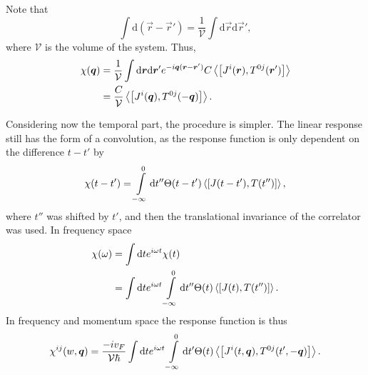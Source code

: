 Note that
\begin{equation}
  \int \mathrm{d}(\vec{r} - \vec{r}') = \frac{1}{\mathcal{V}} \int \mathrm{d}\vec{r} \mathrm{d} \vec{r}',
\end{equation}
where $\mathcal{V}$ is the volume of the system.
Thus,
\begin{equation}
  \begin{split}
    \chi (\vec{q}) &= \frac{1}{\mathcal{V}} \int \mathrm{d}\vec{r} \mathrm{d}\vec{r}'
    e^{-i\vec{q}(\vec{r}-\vec{r}')}
    C \Braket{\left[
        J^i(\vec{r}), T^{0j}(\vec{r}')
      \right]}\\
    &= \frac{C}{\mathcal{V}} \Braket{\left[ J^i(\vec{q}), T^{0j}(-\vec{q}) \right]}.
  \end{split}
\end{equation}

Considering now the temporal part, the procedure is simpler.
The linear response still has the form of a convolution, as the response function is only dependent on the difference $t-t'$ by
\begin{equation}
  \chi (t-t') = \int\limits_{-\infty }^0 \mathrm{d} t'' \Theta (t - t')
  \Braket{\left[ J(t-t'), T(t'') \right]},
\end{equation}
where $t''$ was shifted by $t' $, and then the translational invariance of the correlator was used.
In frequency space
\begin{align}
  \chi (\omega ) &= \int \mathrm{d} t e^{i \omega  t} \chi (t)\\
                 &= \int \mathrm{d} t e^{i \omega  t} \int\limits_{-\infty  }^0 \mathrm{d} t''
                   \Theta (t) \Braket{\left[ J(t), T(t'') \right]}.
\end{align}
In frequency and momentum space the response function is thus
\begin{equation}\label{eq:22}
  \chi ^{ij} (w, \vec{q}) =
  \frac{-iv_F}{\mathcal{V} \hbar }
  \int \mathrm{d}t e^{i\omega t}
  \int\limits_{-\infty }^{0} \mathrm{d}t'
  \Theta (t)
  \Braket{\left[
      J^i(t, \vec{q}), T^{0j}(t', -\vec{q})
    \right]}.
\end{equation}

